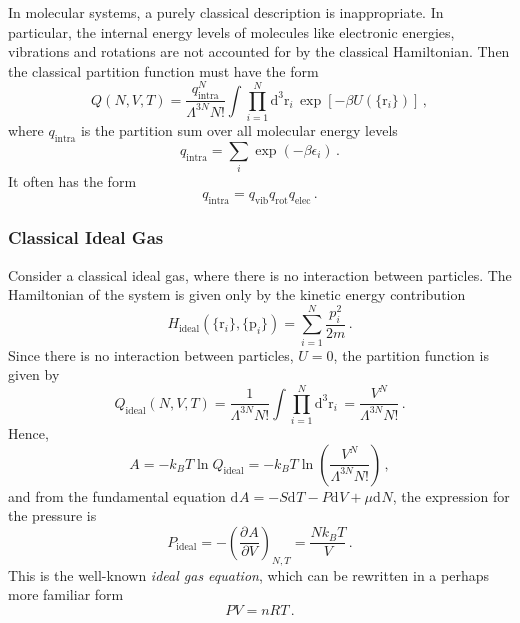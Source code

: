 \documentclass{article}
\theoremstyle{plain}\theoremheaderfont{\normalfont\bfseries}\theorembodyfont{\rmfamily}\theoremseparator{.}\newtheorem*{thm}{Theorem}\newtheorem*{law}{Law}\newtheorem*{pos}{Postulate}
\numberwithin{equation}{section}
\newcommand{\dd}[2][]{\mathrm{d}^{#1} #2\,}
\renewcommand{\d}[2][]{\mathrm{d}^{#1} #2}
\newcommand{\pdv}[3][]{\frac{\partial^{#1} #2}{{\partial #3}^{#1}}}
\newcommand{\vb}[1]{\bm{\mathrm{#1}}}
\begin{document}
    In molecular systems, a purely classical description is inappropriate. In particular, the internal energy levels of molecules like electronic energies, vibrations and rotations are not accounted for by the classical Hamiltonian. Then the classical partition function must have the form
    \begin{equation}
        Q(N,V,T)=\frac{q_{\text{intra}}^N}{\Lambda^{3N}N!}\int\prod_{i=1}^{N}\dd[3]{\vb{r}_i}\exp[-\beta U(\{\vb{r}_i\})]\,,
    \end{equation}
    where \(q_{\text{intra}}\) is the partition sum over all molecular energy levels
    \begin{equation}
        q_{\text{intra}}=\sum_{i}\exp(-\beta\epsilon_i)\,.
    \end{equation}
    It often has the form
    \begin{equation}
        q_{\text{intra}}=q_{\text{vib}}q_{\text{rot}}q_{\text{elec}}\,.
    \end{equation}
    \subsubsection{Classical Ideal Gas}
    Consider a classical ideal gas, where there is no interaction between particles. The Hamiltonian of the system is given only by the kinetic energy contribution
    \begin{equation}
        H_{\text{ideal}}(\{\vb{r}_i\},\{\vb{p}_i\})=\sum_{i=1}^{N}\frac{p_i^2}{2m}\,.
    \end{equation}
    Since there is no interaction between particles, \(U=0\), the partition function is given by
    \begin{equation}
        Q_{\text{ideal}}(N,V,T)=\frac{1}{\Lambda^{3N}N!}\int\prod_{i=1}^{N}\dd[3]{\vb{r}_i}=\frac{V^N}{\Lambda^{3N}N!}\,.
    \end{equation}
    Hence,
    \begin{equation}
        A=-k_B T\ln Q_{\text{ideal}}=-k_B T\ln\left(\frac{V^N}{\Lambda^{3N}N!}\right)\,,
    \end{equation}
    and from the fundamental equation \(\d{A}=-S\d{T}-P\d{V}+\mu\d{N}\), the expression for the pressure is
    \begin{equation}
        P_{\text{ideal}}=-\left(\pdv{A}{V}\right)_{N,T}=\frac{Nk_B T}{V}\,.
    \end{equation}
    This is the well-known \textit{ideal gas equation}, which can be rewritten in a perhaps more familiar form
    \begin{equation}
        PV=nRT\,.
    \end{equation}
\end{document}
